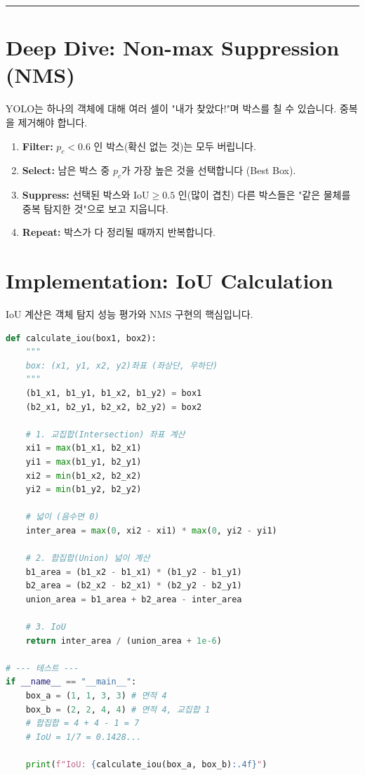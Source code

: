\documentclass[11pt,a4paper]{book}
\theoremstyle{definition}
\begin{document}
\vspace{0.5cm}\hrule\vspace{0.5cm}

\section{Deep Dive: Non-max Suppression (NMS)}

YOLO는 하나의 객체에 대해 여러 셀이 "내가 찾았다!"며 박스를 칠 수 있습니다. 중복을 제거해야 합니다.

\begin{enumerate}
    \item \textbf{Filter:} $p_c < 0.6$ 인 박스(확신 없는 것)는 모두 버립니다.
    \item \textbf{Select:} 남은 박스 중 $p_c$가 가장 높은 것을 선택합니다 (Best Box).
    \item \textbf{Suppress:} 선택된 박스와 $\text{IoU} \ge 0.5$ 인(많이 겹친) 다른 박스들은 "같은 물체를 중복 탐지한 것"으로 보고 지웁니다.
    \item \textbf{Repeat:} 박스가 다 정리될 때까지 반복합니다.
\end{enumerate}

\section{Implementation: IoU Calculation}

IoU 계산은 객체 탐지 성능 평가와 NMS 구현의 핵심입니다.

\begin{lstlisting}[language=Python, caption=IoU Calculation Function, breaklines=true]
def calculate_iou(box1, box2):
    """
    box: (x1, y1, x2, y2)좌표 (좌상단, 우하단)
    """
    (b1_x1, b1_y1, b1_x2, b1_y2) = box1
    (b2_x1, b2_y1, b2_x2, b2_y2) = box2
    
    # 1. 교집합(Intersection) 좌표 계산
    xi1 = max(b1_x1, b2_x1)
    yi1 = max(b1_y1, b2_y1)
    xi2 = min(b1_x2, b2_x2)
    yi2 = min(b1_y2, b2_y2)
    
    # 넓이 (음수면 0)
    inter_area = max(0, xi2 - xi1) * max(0, yi2 - yi1)
    
    # 2. 합집합(Union) 넓이 계산
    b1_area = (b1_x2 - b1_x1) * (b1_y2 - b1_y1)
    b2_area = (b2_x2 - b2_x1) * (b2_y2 - b2_y1)
    union_area = b1_area + b2_area - inter_area
    
    # 3. IoU
    return inter_area / (union_area + 1e-6)

# --- 테스트 ---
if __name__ == "__main__":
    box_a = (1, 1, 3, 3) # 면적 4
    box_b = (2, 2, 4, 4) # 면적 4, 교집합 1
    # 합집합 = 4 + 4 - 1 = 7
    # IoU = 1/7 = 0.1428...
    
    print(f"IoU: {calculate_iou(box_a, box_b):.4f}")
\end{lstlisting}
\end{document}
